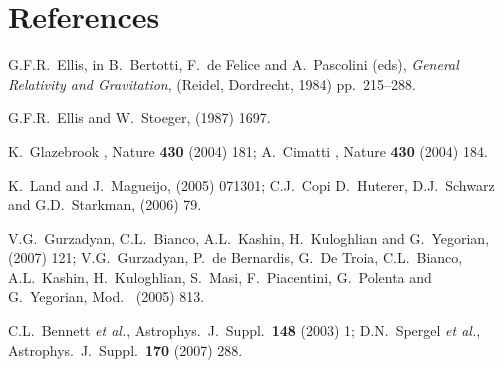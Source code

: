 \documentclass[12pt]{article}
\begin{document}
\section*{References}
\begin{thebibliography}{66}

G.F.R.~Ellis,
in B.~Bertotti, F.~de Felice and A.~Pascolini (eds), {\it General
Relativity and Gravitation}, (Reidel, Dordrecht, 1984) pp.~215--288.

G.F.R.~Ellis and W.~Stoeger,
 (1987) 1697.

K.~Glazebrook \etal,
Nature {\bf430} (2004) 181;
A.~Cimatti \etal,
Nature {\bf430} (2004) 184.

K.~Land and J.~Magueijo,
 (2005) 071301; %
C.J.~Copi D.~Huterer, D.J.~Schwarz and G.D.~Starkman,
 (2006) 79. %

V.G.~Gurzadyan, C.L.~Bianco, A.L.~Kashin, H.~Kuloghlian and G.~Yegorian,
 (2007) 121;\br %
V.G.~Gurzadyan, P.~de Bernardis, G.~De Troia, C.L.~Bianco, A.L.~Kashin,
H.~Kuloghlian, S.~Masi, F.~Piacentini, G.~Polenta and G.~Yegorian,
Mod.\  (2005) 813. %

C.L.~Bennett {\it et al.},
Astrophys.\ J.\ Suppl.\ {\bf148} (2003) 1; %
D.N.~Spergel {\it et al.},
Astrophys.\ J.\ Suppl.\ {\bf170} (2007) 288.%


\end{thebibliography}
\end{document}
